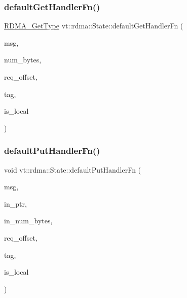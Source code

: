 \subsubsection{\texorpdfstring{default\+Get\+Handler\+Fn()}{defaultGetHandlerFn()}}
{\footnotesize\ttfamily \hyperlink{namespacevt_a1cab7f4860f65a49ad2c042d6240f288}{R\+D\+M\+A\+\_\+\+Get\+Type} vt\+::rdma\+::\+State\+::default\+Get\+Handler\+Fn (\begin{DoxyParamCaption}\item[{\hyperlink{structvt_1_1rdma_1_1_state_message}{State\+Message}$<$ \hyperlink{structvt_1_1rdma_1_1_state}{State} $>$ $\ast$}]{msg,  }\item[{\hyperlink{namespacevt_aab8d55968084610ce3b17057981e9300}{Byte\+Type}}]{num\+\_\+bytes,  }\item[{\hyperlink{namespacevt_aab8d55968084610ce3b17057981e9300}{Byte\+Type}}]{req\+\_\+offset,  }\item[{\hyperlink{namespacevt_a84ab281dae04a52a4b243d6bf62d0e52}{Tag\+Type}}]{tag,  }\item[{bool}]{is\+\_\+local }\end{DoxyParamCaption})\hspace{0.3cm}{\ttfamily [static]}}

\mbox{\label{structvt_1_1rdma_1_1_state_a529be951a782923d38158859111897cd}} 
\subsubsection{\texorpdfstring{default\+Put\+Handler\+Fn()}{defaultPutHandlerFn()}}
{\footnotesize\ttfamily void vt\+::rdma\+::\+State\+::default\+Put\+Handler\+Fn (\begin{DoxyParamCaption}\item[{\hyperlink{structvt_1_1rdma_1_1_state_message}{State\+Message}$<$ \hyperlink{structvt_1_1rdma_1_1_state}{State} $>$ $\ast$}]{msg,  }\item[{\hyperlink{namespacevt_a9e2c953286c7616f7c218e9951790776}{R\+D\+M\+A\+\_\+\+Ptr\+Type}}]{in\+\_\+ptr,  }\item[{\hyperlink{namespacevt_aab8d55968084610ce3b17057981e9300}{Byte\+Type}}]{in\+\_\+num\+\_\+bytes,  }\item[{\hyperlink{namespacevt_aab8d55968084610ce3b17057981e9300}{Byte\+Type}}]{req\+\_\+offset,  }\item[{\hyperlink{namespacevt_a84ab281dae04a52a4b243d6bf62d0e52}{Tag\+Type}}]{tag,  }\item[{bool}]{is\+\_\+local }\end{DoxyParamCaption})\hspace{0.3cm}{\ttfamily [static]}}

